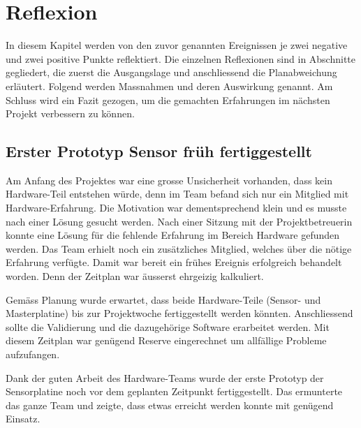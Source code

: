 \chapter{Reflexion}
\label{chap:reflexion}

In diesem Kapitel werden von den  zuvor genannten Ereignissen je zwei negative
und  zwei  positive  Punkte  reflektiert. Die einzelnen  Reflexionen  sind  in
Abschnitte  gegliedert,  die zuerst  die  Ausgangslage  und anschliessend  die
Planabweichung  erl\"autert. Folgend werden  Massnahmen  und deren  Auswirkung
genannt. Am Schluss  wird ein Fazit  gezogen, um die gemachten  Erfahrungen im
n\"achsten Projekt verbessern zu k\"onnen.

\section{Erster Prototyp Sensor fr\"uh fertiggestellt}
\label{sec:firstSensorprototype}

Am  Anfang des  Projektes war  eine grosse  Unsicherheit vorhanden,  dass kein
Hardware-Teil entstehen  w\"urde, denn  im Team befand  sich nur  ein Mitglied
mit  Hardware-Erfahrung. Die  Motivation  war  dementsprechend  klein  und  es
musste  nach  einer  L\"osung  gesucht  werden. Nach  einer  Sitzung  mit  der
Projektbetreuerin  konnte  eine  L\"osung  f\"ur  die  fehlende  Erfahrung  im
Bereich  Hardware gefunden  werden. Das Team  erhielt noch  ein zus\"atzliches
Mitglied, welches \"uber die n\"otige  Erfahrung verf\"ugte.  Damit war bereit
ein  fr\"uhes Ereignis  erfolgreich  behandelt worden. Denn  der Zeitplan  war
\"ausserst ehrgeizig kalkuliert.

Gem\"ass   Planung  wurde   erwartet,  dass   beide  Hardware-Teile   (Sensor-
und    Masterplatine)    bis    zur   Projektwoche    fertiggestellt    werden
k\"onnten. Anschliessend  sollte   die  Validierung  und   die  dazugeh\"orige
Software  erarbeitet  werden. Mit  diesem   Zeitplan  war  gen\"ugend  Reserve
eingerechnet um allf\"allige Probleme aufzufangen.

Dank  der  guten  Arbeit  des  Hardware-Teams wurde  der  erste  Prototyp  der
Sensorplatine noch vor dem  geplanten Zeitpunkt fertiggestellt. Das ermunterte
das ganze  Team und zeigte, dass  etwas erreicht werden konnte  mit gen\"ugend
Einsatz.

